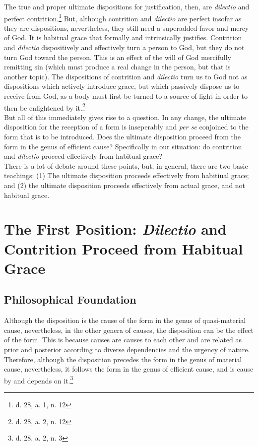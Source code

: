 \documentclass[11pt]{memoir}
\begin{document}
\noindent The true and proper ultimate dispositions for justification, then, are \emph{dilectio} and perfect
contrition.\footnote{d. 28, a. 1, n. 12} But, although contrition and \emph{dilectio} are perfect insofar as they are
dispositions, nevertheless, they still need a superadded favor and mercy of God. It is habitual grace that formally and
intrinsically justifies. Contrition and \emph{dilectio} dispositively and effectively turn a person to God, but they do
not turn God toward the person. This is an effect of the will of God mercifully remitting sin (which must produce a real
change in the person, but that is another topic). The dispositions of contrition and \emph{dilectio} turn us to God not
as dispositions which actively introduce grace, but which passively dispose us to receive from God, as a body must first
be turned to a source of light in order to then be enlightened by it.\footnote{d. 28, a. 2, n. 12} \\

\noindent But all of this immediately gives rise to a question. In any change, the ultimate disposition for the reception of a
form is inseperably and \emph{per se} conjoined to the form that is to be introduced. Does the ultimate disposition
proceed from the form in the genus of efficient cause? Specifically in our situation: do contrition and \emph{dilectio}
proceed effectively from habitual grace? \\

\noindent There is a lot of debate around these points, but, in general, there are two basic teachings: (1) The ultimate
disposition proceeds effectively from habitiual grace; and (2) the ultimate disposition proceeds effectively from actual
grace, and not habitual grace.

\section*{The First Position: \emph{Dilectio} and Contrition Proceed from Habitual Grace}

    \subsection*{Philosophical Foundation}

    Although the disposition is the cause of the form in the genus of quasi-material cause, nevertheless, in the other
    genera of causes, the disposition can be the effect of the form. This is because causes are causes to each other and
    are related as prior and posterior according to diverse dependencies and the urgency of nature. Therefore, although
    the disposition precedes the form in the genus of material cause, nevertheless, it follows the form in the genus of
    efficient cause, and is cause by and depends on it.\footnote{d. 28, a. 2, n. 3} \\
    
\end{document}
